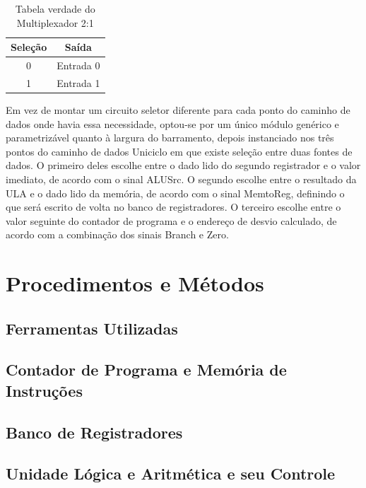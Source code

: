 \documentclass[conference]{IEEEtran}
\begin{document}
\begin{table}[!t]
\caption{Tabela verdade do Multiplexador 2:1}
\begin{center}
\begin{tabular}{c|c}
\hline \hline
\textbf{Seleção} & \textbf{Saída} \\
\hline
0 & Entrada 0 \\
1 & Entrada 1 \\
\hline \hline
\end{tabular}
\end{center}
\label{tab:mux}
\end{table}

Em vez de montar um circuito seletor diferente para cada ponto do caminho de dados onde havia essa
necessidade, optou-se por um único módulo genérico e parametrizável quanto à largura do barramento, depois
instanciado nos três pontos do caminho de dados Uniciclo em que existe seleção entre duas fontes de dados.
O primeiro deles escolhe entre o dado lido do segundo registrador e o valor imediato, de acordo com o
sinal ALUSrc. O segundo escolhe entre o resultado da ULA e o dado lido da memória, de acordo com o sinal
MemtoReg, definindo o que será escrito de volta no banco de registradores. O terceiro escolhe entre o
valor seguinte do contador de programa e o endereço de desvio calculado, de acordo com a combinação dos
sinais Branch e Zero.

\section{Procedimentos e Métodos}

\subsection{Ferramentas Utilizadas}

\subsection{Contador de Programa e Memória de Instruções}

\subsection{Banco de Registradores}

\subsection{Unidade Lógica e Aritmética e seu Controle}
\end{document}
